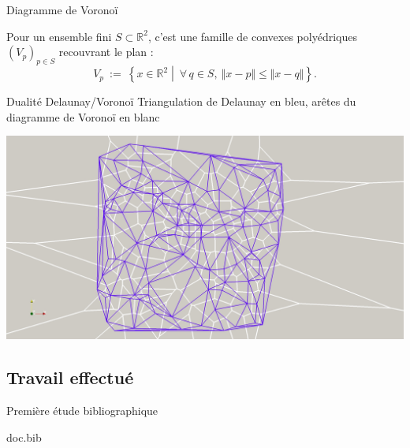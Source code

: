 \documentclass[aspectratio=169, 12pt, a4paper, hyperref={pdfauthor={Alexandre MARIN}, pdfkeywords={IFPEN, Delaunay, Voronoi, mesh generation}, colorlinks=true, linkcolor=purple, urlcolor=blue, citecolor=magenta}]{beamer}
\begin{document}
\begin{Energie}{Diagramme de Voronoï}

Pour un ensemble fini $S\subset\mathbb{R}^2$, c'est une famille de convexes polyédriques $(V_{p})_{p\in S}$ recouvrant le plan :
\[V_p\ :=\ \left\{x\in\mathbb{R}^2\middle\vert\ \forall\,q\in S,\ \Vert x-p\Vert\leqslant\Vert x-q\Vert\right\}\text{.}\]
\end{Energie}

\begin{Energie}{Dualité Delaunay/Voronoï}
\vspace*{-1cm}Triangulation de Delaunay en bleu,
arêtes du diagramme de Voronoï en blanc\\[0.8cm]
\begin{center}
\includegraphics[scale=0.18, viewport=450 30 1630 1300, clip]{duality.jpg}
\end{center}
\end{Energie}

\subsection{Travail effectué}
\begin{Energie}{Première étude bibliographique}

\begin{btSect}{doc.bib}
\btPrintCited
\btPrintNotCited
\end{btSect}
\label{biblio}
\end{Energie}
\end{document}
